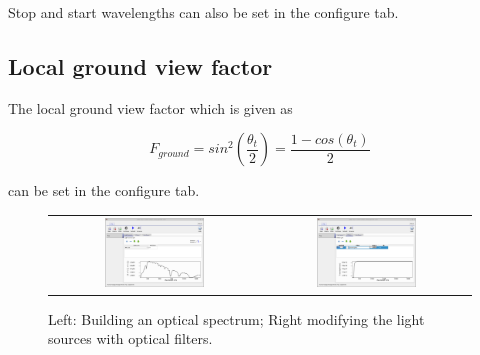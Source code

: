 Stop and start wavelengths can also be set in the configure tab.

\subsection{Local ground view factor}
The local ground view factor which is given as \cite{neryterrain}

\begin{equation}
F_{ground}=sin^2 \left ( \frac{\theta_t}{2}\right )=\frac{1-cos(\theta_t)}{2}
\end{equation}

can be set in the configure tab.

\begin{figure}[H]
\centering
\begin{tabular}{ c c }

\includegraphics[width=0.5\textwidth,height=0.4\textwidth]{./images/lights0.png}

&
\includegraphics[width=0.5\textwidth,height=0.4\textwidth]{./images/lights1.png}
\\
\end{tabular}
\caption{Left: Building an optical spectrum; Right modifying the light sources with optical filters.}
\end{figure}


